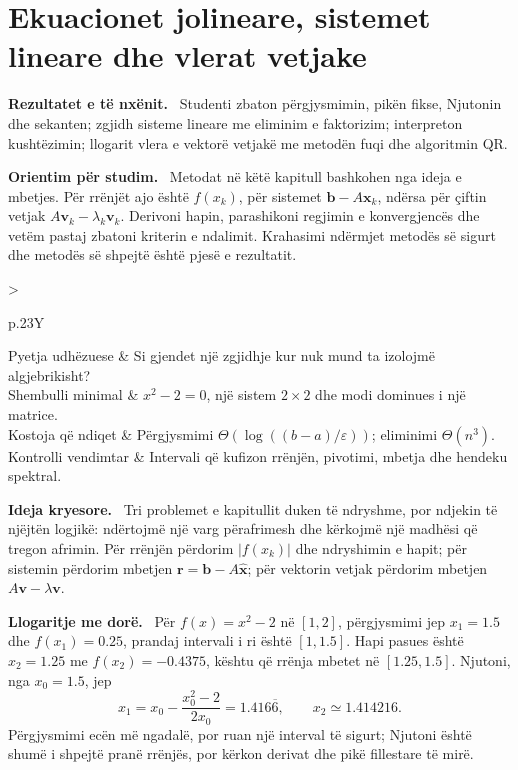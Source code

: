 \documentclass[11pt,oneside,openany]{book}
\newcommand{\vect}[1]{\bm{#1}}
\newenvironment{qellime}{\par\medskip\noindent\textbf{Rezultatet e të nxënit.}\ }{\par\medskip}
\newenvironment{orientim}{\par\medskip\noindent\textbf{Orientim për studim.}\ }{\par\medskip}
\newenvironment{ideja}{\par\medskip\noindent\textbf{Ideja kryesore.}\ }{\par\medskip}
\newenvironment{llogaritjedore}{\par\medskip\noindent\textbf{Llogaritje me dorë.}\ }{\par\medskip}
\newcommand{\hartakapitullit}[4]{%
\par\smallskip
\noindent\begin{tabularx}{\textwidth}{>{\bfseries\raggedright\arraybackslash}p{.23\textwidth}Y}
Pyetja udhëzuese & #1\\
Shembulli minimal & #2\\
Kostoja që ndiqet & #3\\
Kontrolli vendimtar & #4
\end{tabularx}\par\medskip}
\begin{document}




\chapter{Ekuacionet jolineare, sistemet lineare dhe vlerat vetjake}
\begin{qellime}
Studenti zbaton përgjysmimin, pikën fikse, Njutonin dhe sekanten; zgjidh sisteme lineare me eliminim e faktorizim; interpreton kushtëzimin; llogarit vlera e vektorë vetjakë me metodën fuqi dhe algoritmin QR.
\end{qellime}

\begin{orientim}
Metodat në këtë kapitull bashkohen nga ideja e mbetjes. Për rrënjët ajo është
$f(x_k)$, për sistemet $\vect b-A\vect x_k$, ndërsa për çiftin vetjak
$A\vect v_k-\lambda_k\vect v_k$. Derivoni hapin, parashikoni regjimin e
konvergjencës dhe vetëm pastaj zbatoni kriterin e ndalimit. Krahasimi ndërmjet
metodës së sigurt dhe metodës së shpejtë është pjesë e rezultatit.
\end{orientim}

\hartakapitullit
{Si gjendet një zgjidhje kur nuk mund ta izolojmë algjebrikisht?}
{$x^2-2=0$, një sistem $2\times2$ dhe modi dominues i një matrice.}
{Përgjysmimi $\Theta(\!\log((b-a)/\varepsilon))$; eliminimi $\Theta(n^3)$.}
{Intervali që kufizon rrënjën, pivotimi, mbetja dhe hendeku spektral.}

\begin{ideja}
Tri problemet e kapitullit duken të ndryshme, por ndjekin të njëjtën logjikë:
ndërtojmë një varg përafrimesh dhe kërkojmë një madhësi që tregon afrimin.
Për rrënjën përdorim $|f(x_k)|$ dhe ndryshimin e hapit; për sistemin përdorim
mbetjen $\vect r=\vect b-A\widehat{\vect x}$; për vektorin vetjak përdorim
mbetjen $A\vect v-\lambda\vect v$.
\end{ideja}

\begin{llogaritjedore}
Për $f(x)=x^2-2$ në $[1,2]$, përgjysmimi jep $x_1=1.5$ dhe
$f(x_1)=0.25$, prandaj intervali i ri është $[1,1.5]$. Hapi pasues është
$x_2=1.25$ me $f(x_2)=-0.4375$, kështu që rrënja mbetet në
$[1.25,1.5]$. Njutoni, nga $x_0=1.5$, jep
\begin{equation}
 x_1=x_0-\frac{x_0^2-2}{2x_0}=1.416\overline6,\qquad
 x_2\simeq1.414216.
\end{equation}
Përgjysmimi ecën më ngadalë, por ruan një interval të sigurt; Njutoni është
shumë i shpejtë pranë rrënjës, por kërkon derivat dhe pikë fillestare të mirë.
\end{llogaritjedore}
\end{document}
